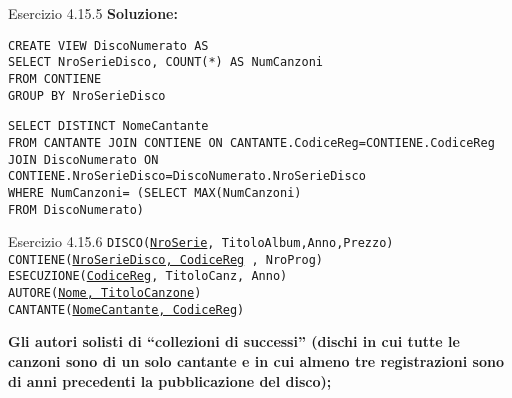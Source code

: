 \begin{frame}{Esercizio 4.15.5}
    \textbf{Soluzione:}
    \vspace{1em}
    
    \texttt{CREATE VIEW DiscoNumerato AS\\ SELECT NroSerieDisco, COUNT(*) AS NumCanzoni
\\FROM CONTIENE\\GROUP BY NroSerieDisco}
\vspace{1em}

    \texttt{SELECT DISTINCT NomeCantante\\FROM CANTANTE JOIN CONTIENE ON CANTANTE.CodiceReg=CONTIENE.CodiceReg\\JOIN DiscoNumerato ON
CONTIENE.NroSerieDisco=DiscoNumerato.NroSerieDisco\\WHERE NumCanzoni= (SELECT MAX(NumCanzoni)\\ \hspace{9.5em}FROM DiscoNumerato)}
    \end{frame}
\begin{frame}{Esercizio 4.15.6}
    \texttt{DISCO(\underline{NroSerie}, TitoloAlbum,Anno,Prezzo)\\
    CONTIENE(\underline{NroSerieDisco, CodiceReg} , NroProg)\\
    ESECUZIONE(\underline{CodiceReg}, TitoloCanz, Anno)\\
    AUTORE(\underline{Nome, TitoloCanzone})\\
    CANTANTE(\underline{NomeCantante, CodiceReg})}
    \vspace{1em}
    
    \textbf{Gli autori solisti di ``collezioni di successi'' (dischi in cui tutte le canzoni sono di un solo cantante e in cui almeno tre registrazioni sono di anni precedenti la pubblicazione del disco);}
\end{frame}

